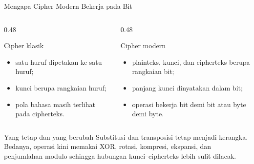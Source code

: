 \documentclass[aspectratio=169,11pt]{beamer}
\begin{document}
\begin{frame}{Mengapa Cipher Modern Bekerja pada Bit}
    \footnotesize
    \begin{columns}[T,onlytextwidth]
        \begin{column}{0.48\textwidth}
            \begin{block}{Cipher klasik}
                \begin{itemize}
                    \item satu huruf dipetakan ke satu huruf;
                    \item kunci berupa rangkaian huruf;
                    \item pola bahasa masih terlihat pada cipherteks.
                \end{itemize}
            \end{block}
        \end{column}
        \begin{column}{0.48\textwidth}
            \begin{block}{Cipher modern}
                \begin{itemize}
                    \item plainteks, kunci, dan cipherteks berupa rangkaian bit;
                    \item panjang kunci dinyatakan dalam bit;
                    \item operasi bekerja bit demi bit atau byte demi byte.
                \end{itemize}
            \end{block}
        \end{column}
    \end{columns}
    \vspace{0.15cm}
    \begin{block}{Yang tetap dan yang berubah}
        Substitusi dan transposisi tetap menjadi kerangka. Bedanya, operasi
        kini memakai XOR, rotasi, kompresi, ekspansi, dan penjumlahan modulo
        sehingga hubungan kunci--cipherteks lebih sulit dilacak.
    \end{block}
\end{frame}
\end{document}
